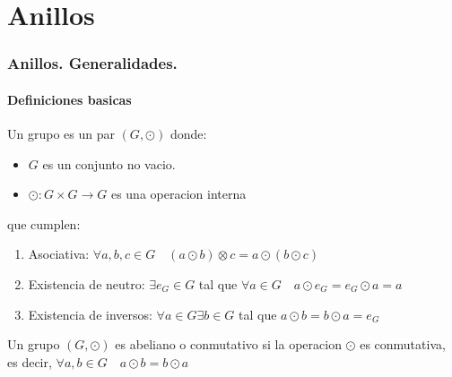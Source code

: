 \part{Anillos}
\section{Anillos. Generalidades.}
\subsection{Definiciones basicas}
\begin{definition}
	Un grupo es un par \((G, \odot )\) donde:
	\begin{itemize}
		\item \(G \) es un conjunto no vacio.
		\item \(\odot: G \times G \to G\) es una operacion interna
	\end{itemize}
	que cumplen:
	\begin{enumerate}
		\item Asociativa: \(\forall a,b,c \in G \quad (a \odot b ) \otimes c = a \odot (b \odot c )\)
		\item Existencia de neutro: \(\exists e_G \in G \) tal que \(\forall  a \in G \quad a \odot e_G = e_G \odot a = a \)
		\item Existencia de inversos: \(\forall a \in G \exists b \in G \) tal que \(a \odot b = b \odot a = e_G \)
	\end{enumerate}
\end{definition}
\begin{definition}
	Un grupo \((G, \odot )\) es abeliano o conmutativo si la operacion \(\odot \) es conmutativa, es decir, \(\forall  a, b \in  G \quad a \odot b = b \odot a\)
\end{definition}

